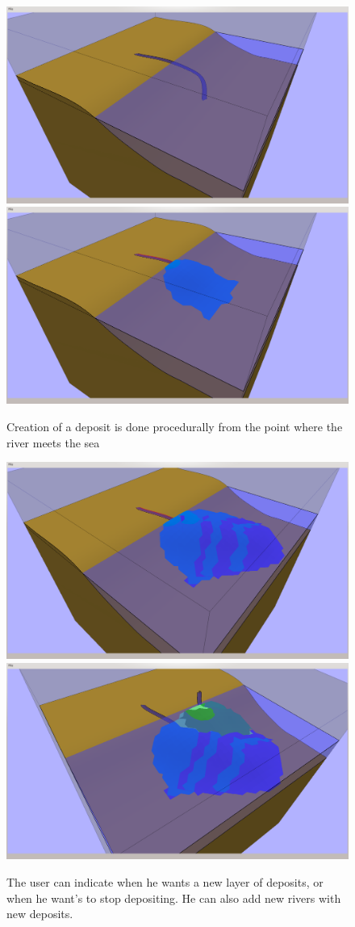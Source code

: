 \documentclass[a4paper,12pt]{report}
\begin{document}
\begin{figure}
\includegraphics[trim = 90mm 7mm 80mm 30mm, clip,width=.5\linewidth]{thesis/results/depositBefore.png}
\includegraphics[trim = 90mm 7mm 80mm 30mm, clip,width=.5\linewidth]{thesis/results/depositCreated.png}
 \caption{Creation of a deposit is done procedurally from the point where the river meets the sea}
 \label{fig:depositCreate}
\end{figure}


\begin{figure}
\includegraphics[trim = 120mm 7mm 30mm 30mm, clip,width=.5\linewidth]{thesis/results/depositLayered.png}
\includegraphics[trim = 120mm 7mm 30mm 30mm, clip,width=.5\linewidth]{thesis/results/depositNew.png}
 \caption{The user can indicate when he wants a new layer of deposits, or when he want's to stop depositing. He can also add new rivers with new deposits.}
 \label{fig:depositLayer}
\end{figure}
\end{document}
